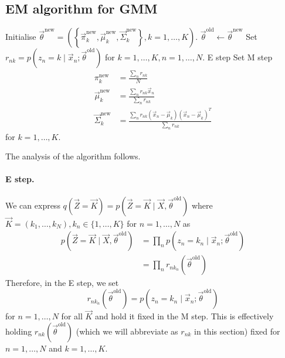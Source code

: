 \subsection{EM algorithm for GMM}
\begin{algorithmbis}\label{alg:models-mm-em-gmm}
    \begin{algorithmic}[1]
        \State Initialise $\vec \theta^{\text{new}} = \left(\left\{\vec \pi_k^{\text{new}}, \vec \mu_k^{\text{new}}, \vec \Sigma_k^{\text{new}}\right\}, k = 1, \dotsc, K\right)$.
        \Repeat
            \State $\vec \theta^{\text{old}} \gets \vec \theta^{\text{new}}$
            \State Set $r_{nk} = p\left(z_n = k \mid \vec x_n; \vec \theta^{\text{old}}\right)$ for $k = 1, \dotsc, K, n = 1, \dotsc, N$. \Comment E step
            \State Set \Comment M step
                \begin{align*}
                    \pi_k^{\text{new}}           &= \frac{\sum_n r_{nk}}{N} \\
                    \vec \mu_k^{\text{new}}      &= \frac{\sum_n r_{nk} \vec x_n}{\sum_n r_{nk}} \\
                    \vec \Sigma_k^{\text{new}}   &= \frac{\sum_n r_{nk}(\vec x_n - \vec \mu_k)(\vec x_n - \vec \mu_k)^T}{\sum_n r_{nk}}
                \end{align*}
                for $k = 1, \dotsc, K$.
    \end{algorithmic}
\end{algorithmbis}

The analysis of the algorithm follows.
\paragraph{E step.} We can express $q(\vec Z = \vec K) = p(\vec Z = \vec K \mid \vec X, \vec \theta^{\text{old}})$ where $\vec K = (k_1, \dotsc, k_N), k_n \in \{1, \dotsc, K\}$ for $n =  1, \dotsc, N$ as
\begin{align*}
    p(\vec Z = \vec K \mid \vec X, \vec \theta^{\text{old}})    &= \prod_n p\left(z_n = k_n \mid \vec x_n; \vec \theta^{\text{old}}\right) \\
                                                                &= \prod_n r_{nk_n}\left(\vec \theta^{\text{old}}\right)
\end{align*}
Therefore, in the E step, we set
\begin{equation}
    r_{nk_n}\left(\vec \theta^{\text{old}}\right) = p\left(z_n = k_n \mid \vec x_n; \vec \theta^{\text{old}}\right)
\end{equation}
for $n = 1, \dotsc, N$ for all $\vec K$ and hold it fixed in the M step. This is effectively holding $r_{nk}\left(\vec \theta^{\text{old}}\right)$ (which we will abbreviate as $r_{nk}$ in this section) fixed for $n = 1, \dotsc, N$ and $k = 1, \dotsc, K$.

